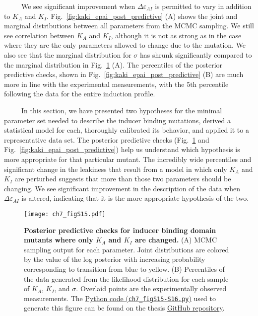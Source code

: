 \documentclass[12pt]{caltech_thesis}
\begin{document}
~~~~~We see significant improvement when \(\Delta\varepsilon_{AI}\) is
permitted to vary in addition to \(K_A\) and \(K_I\).
Fig.~\ref{fig:kaki_epai_post_predictive} (A) shows the joint and
marginal distributions between all parameters from the MCMC sampling. We
still see correlation between \(K_A\) and \(K_I\), although it is not as
strong as in the case where they are the only parameters allowed to
change due to the mutation. We also see that the marginal distribution
for \(\sigma\) has shrunk significantly compared to the marginal
distribution in Fig.~\ref{fig:kaki_post_predictive} (A). The percentiles
of the posterior predictive checks, shown in
Fig.~\ref{fig:kaki_epai_post_predictive} (B) are much more in line with
the experimental measurements, with the 5\(\text{th}\) percentile
following the data for the entire induction profile.

~~~~~In this section, we have presented two hypotheses for the minimal
parameter set needed to describe the inducer binding mutations, derived
a statistical model for each, thoroughly calibrated its behavior, and
applied it to a representative data set. The posterior predictive checks
(Fig.~\ref{fig:kaki_post_predictive} and
Fig.~\ref{fig:kaki_epai_post_predictive}) help us understand which
hypothesis is more appropriate for that particular mutant. The
incredibly wide percentiles and significant change in the leakiness that
result from a model in which only \(K_A\) and \(K_I\) are perturbed
suggests that more than those two parameters should be changing. We see
significant improvement in the description of the data when
\(\Delta\varepsilon_{AI}\) is altered, indicating that it is the more
appropriate hypothesis of the two.

\hypertarget{fig:kaki_post_predictive}{%
\begin{figure}
\centering
\texttt{[image: ch7\_figS15.pdf]}
\caption[{Posterior predictive checks for inducer binding domain mutants
where only \(K_A\) and \(K_I\) are changed.}]{\textbf{Posterior
predictive checks for inducer binding domain mutants where only \(K_A\)
and \(K_I\) are changed.} (A) MCMC sampling output for each parameter.
Joint distributions are colored by the value of the log posterior with
increasing probability corresponding to transition from blue to yellow.
(B) Percentiles of the data generated from the likelihood distribution
for each sample of \(K_A\), \(K_I\), and \(\sigma\). Overlaid points are
the experimentally observed measurements. The
\href{https://github.com/gchure/phd/blob/master/src/chapter_07/code/ch7_figS15-S16.py}{Python
code (\texttt{ch7\_figS15-S16.py})} used to generate this figure can be
found on the thesis \href{https://github.com/gchure/phd}{GitHub
repository}.}
\label{fig:kaki_post_predictive}
\end{figure}
}
\end{document}

